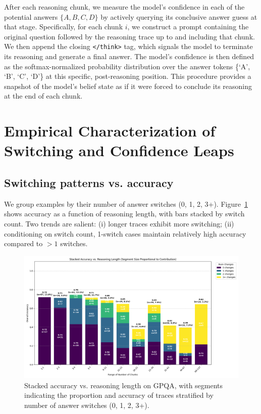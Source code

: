 \documentclass{article}
\begin{document}
After each reasoning chunk, we measure the model's confidence in each of the potential answers $\{A, B, C, D\}$ by actively querying its conclusive answer guess at that stage. Specifically, for each chunk $i$, we construct a prompt containing the original question followed by the reasoning trace up to and including that chunk. We then append the closing \texttt{</think>} tag, which signals the model to terminate its reasoning and generate a final answer. The model's confidence is then defined as the softmax-normalized probability distribution over the answer tokens \{`A', `B', `C', `D'\} at this specific, post-reasoning position. This procedure provides a snapshot of the model's belief state as if it were forced to conclude its reasoning at the end of each chunk.

\section{Empirical Characterization of Switching and Confidence Leaps}
\label{sec:phenomena}

\subsection{Switching patterns vs. accuracy}
We group examples by their number of answer switches (0, 1, 2, 3+). Figure~\ref{fig:stacked_accuracy_changes} shows accuracy as a function of reasoning length, with bars stacked by switch count. Two trends are salient: (i) longer traces exhibit more switching; (ii) conditioning on switch count, 1-switch cases maintain relatively high accuracy compared to $>1$ switches.

\begin{figure}[t]
    \centering
    \includegraphics[width=0.95\linewidth]{analysis_results/accuracy_vs_length/binned_accuracy_vs_length_by_changes_reasoning_traces_gpqa_Qwen_Qwen3-32B.png}
    \caption{Stacked accuracy vs. reasoning length on GPQA, with segments indicating the proportion and accuracy of traces stratified by number of answer switches (0, 1, 2, 3+).}
    \label{fig:stacked_accuracy_changes}
\end{figure}
\end{document}

